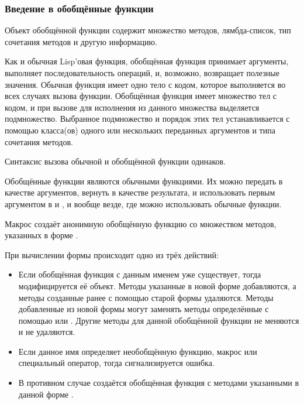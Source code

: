 \subsubsection{Введение в обобщённые функции}

Объект обобщённой функции содержит множество методов, лямбда-список, тип
сочетания методов и другую информацию.

Как и обычная Lisp'овая функция, обобщённая функция принимает аргументы,
выполняет последовательность операций, и, возможно, возвращает полезные значения.
Обычная функция имеет одно тело с кодом, которое выполняется во всех случаях
вызова функции. Обобщённая функция имеет множество тел с кодом, и при вызове для
исполнения из данного множества выделяется подмножество. Выбранное подмножество
и порядок этих тел устанавливается с помощью класса(ов) одного или
нескольких переданных аргументов и типа сочетания методов.

Синтаксис вызова обычной и обобщённой функции одинаков.

Обобщённые функции являются обычными функциями. Их можно передать в
качестве аргументов, вернуть в качестве результата, и использовать первым
аргументом в  и , и вообще везде, где можно использовать
обычные функции.

Макрос  создаёт анонимную обобщённую функцию со множеством
методов, указанных в форме .

При вычислении формы  происходит одно из трёх действий:

\begin{itemize}
\item Если обобщённая функция с данным именем уже существует, тогда
  модифицируется её объект. Методы указанные в новой форме 
  добавляются, а методы созданные ранее с помощью старой формы 
  удаляются. Методы добавленные из новой формы  могут заменять
  методы определённые с помощью  или . Другие
  методы для данной обобщённой функции не меняются и не удаляются.

\item Если данное имя определяет необобщённую функцию, макрос или специальный
  оператор, тогда сигнализируется ошибка.

\item В противном случае создаётся обобщённая функция с методами указанными в
  данной форме .
\end{itemize}

